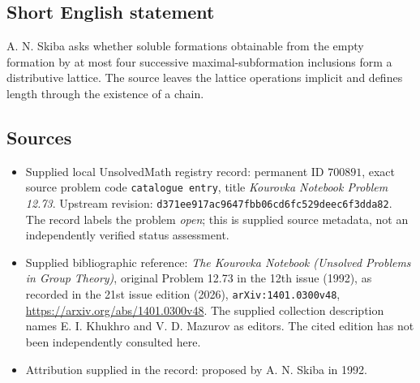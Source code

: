 \documentclass[11pt]{article}
\begin{document}
\subsection{Short English statement}
A. N. Skiba asks whether soluble formations obtainable from the empty formation by at most four successive maximal-subformation inclusions form a distributive lattice. The source leaves the lattice operations implicit and defines length through the existence of a chain.
\subsection{Sources}
\begin{itemize}
\item Supplied local UnsolvedMath registry record: permanent ID \(700891\), exact source problem code \texttt{catalogue entry}, title \emph{Kourovka Notebook Problem 12.73}. Upstream revision: \texttt{d371ee917ac9647fbb06cd6fc529deec6f3dda82}. The record labels the problem \emph{open}; this is supplied source metadata, not an independently verified status assessment.
\item Supplied bibliographic reference: \emph{The Kourovka Notebook (Unsolved Problems in Group Theory)}, original Problem 12.73 in the 12th issue (1992), as recorded in the 21st issue edition (2026), \texttt{arXiv:1401.0300v48}, \url{https://arxiv.org/abs/1401.0300v48}. The supplied collection description names E. I. Khukhro and V. D. Mazurov as editors. The cited edition has not been independently consulted here.
\item Attribution supplied in the record: proposed by A. N. Skiba in 1992.
\end{itemize}
\end{document}

